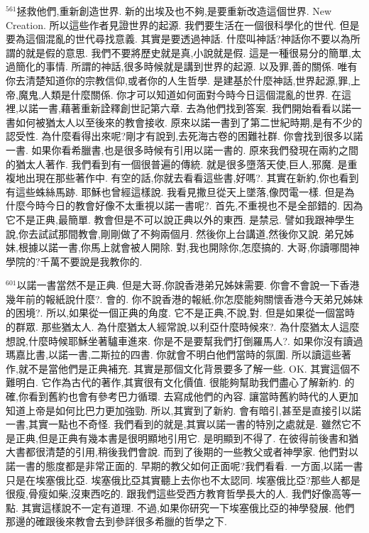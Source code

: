 \documentclass{book}
\begin{document}
$^{561}$拯救他們,重新創造世界.
新的出埃及也不夠,是要重新改造這個世界.
New Creation.
所以這些作者見證世界的起源.
我們要生活在一個很科學化的世代.
但是要為這個混亂的世代尋找意義.
其實是要透過神話.
什麼叫神話?神話你不要以為所謂的就是假的意思.
我們不要將歷史就是真,小說就是假.
這是一種很易分的簡單,太過簡化的事情.
所謂的神話,很多時候就是講到世界的起源.
以及罪,善的關係.
唯有你去清楚知道你的宗教信仰,或者你的人生哲學.
是建基於什麼神話,世界起源,罪,上帝,魔鬼,人類是什麼關係.
你才可以知道如何面對今時今日這個混亂的世界.
在這裡,以諾一書,藉著重新詮釋創世記第六章.
去為他們找到答案.
我們開始看看以諾一書如何被猶太人以至後來的教會接收.
原來以諾一書到了第二世紀時期,是有不少的認受性.
為什麼看得出來呢?剛才有說到,去死海古卷的困難社群.
你會找到很多以諾一書.
如果你看希臘書,也是很多時候有引用以諾一書的.
原來我們發現在兩約之間的猶太人著作.
我們看到有一個很普遍的傳統.
就是很多墮落天使,巨人,邪魔.
是重複地出現在那些著作中.
有空的話,你就去看看這些書,好嗎?.
其實在新約,你也看到有這些蛛絲馬跡.
耶穌也曾經這樣說.
我看見撒旦從天上墜落,像閃電一樣.
但是為什麼今時今日的教會好像不太重視以諾一書呢?.
首先,不重視也不是全部錯的.
因為它不是正典,最簡單.
教會但是不可以說正典以外的東西.
是禁忌.
譬如我跟神學生說,你去試試那間教會,剛剛做了不夠兩個月.
然後你上台講道,然後你又說.
弟兄姊妹,根據以諾一書,你馬上就會被人開除.
對,我也開除你,怎麼搞的.
大哥,你讀哪間神學院的?千萬不要說是我教你的.

$^{601}$以諾一書當然不是正典.
但是大哥,你說香港弟兄姊妹需要.
你會不會說一下香港幾年前的報紙說什麼?.
會的.
你不說香港的報紙,你怎麼能夠關懷香港今天弟兄姊妹的困境?.
所以,如果從一個正典的角度.
它不是正典,不說,對.
但是如果從一個當時的群眾.
那些猶太人.
為什麼猶太人經常說,以利亞什麼時候來?.
為什麼猶太人這麼想說,什麼時候耶穌坐著驢車進來.
你是不是要幫我們打倒羅馬人?.
如果你沒有讀過瑪嘉比書,以諾一書,二斯拉的四書.
你就會不明白他們當時的氛圍.
所以讀這些著作,就不是當他們是正典補充.
其實是那個文化背景要多了解一些.
OK.
其實這個不難明白.
它作為古代的著作,其實很有文化價值.
很能夠幫助我們盡心了解新約.
的確,你看到舊約也會有參考巴力循環.
去寫成他們的內容.
讓當時舊約時代的人更加知道上帝是如何比巴力更加強勁.
所以,其實到了新約.
會有暗引,甚至是直接引以諾一書,其實一點也不奇怪.
我們看到的就是,其實以諾一書的特別之處就是.
雖然它不是正典,但是正典有幾本書是很明顯地引用它.
是明顯到不得了.
在彼得前後書和猶大書都很清楚的引用,稍後我們會說.
而到了後期的一些教父或者神學家.
他們對以諾一書的態度都是非常正面的.
早期的教父如何正面呢?我們看看.
一方面,以諾一書只是在埃塞俄比亞.
埃塞俄比亞其實聽上去你也不太認同.
埃塞俄比亞?那些人都是很瘦,骨瘦如柴,沒東西吃的.
跟我們這些受西方教育哲學長大的人.
我們好像高等一點.
其實這樣說不一定有道理.
不過,如果你研究一下埃塞俄比亞的神學發展.
他們那邊的確跟後來教會去到參詳很多希臘的哲學之下.
\end{document}
